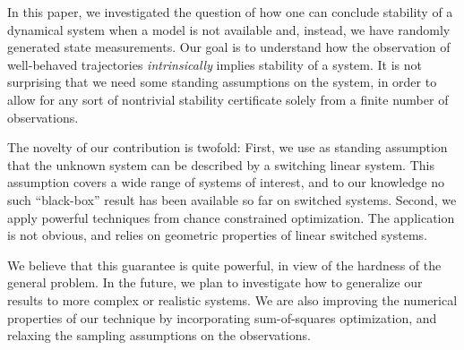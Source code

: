 In this paper, we investigated the question of how one can conclude stability of a dynamical system when a model is not available and, instead, we have randomly generated state measurements. Our goal is to understand how the observation of well-behaved trajectories \emph{intrinsically} implies stability of a system. It is not surprising that we need some standing assumptions on the system, in order to allow for any sort of nontrivial stability certificate solely from a finite number of observations.

The novelty of our contribution is twofold: First, we use as standing assumption that the unknown system can be described by a switching linear system. This assumption covers a wide range of systems of interest, and to our knowledge no such ``black-box'' result has been available so far on switched systems.  
Second, we apply powerful techniques from chance constrained optimization. The application is not obvious, and relies on geometric properties of linear switched systems.

We believe that this guarantee is quite powerful, in view of the hardness of the general problem. In the future, we plan to investigate how to generalize our results to more complex or realistic systems. We are also improving the numerical properties of our technique by incorporating sum-of-squares optimization, and relaxing the sampling assumptions on the observations.
